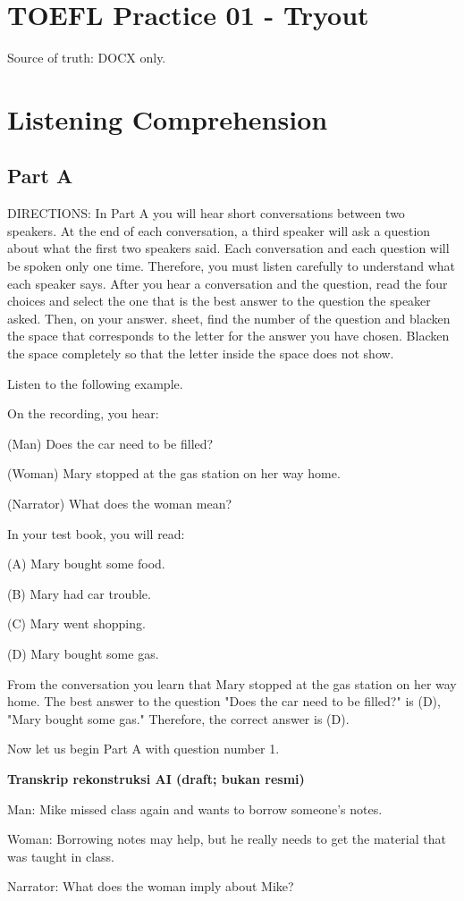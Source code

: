 \documentclass[12pt]{article}
\begin{document}
\section*{TOEFL Practice 01 - Tryout}
Source of truth: DOCX only.
\section*{Listening Comprehension}
\subsection*{Part A}
DIRECTIONS: In Part A you will hear short conversations between two speakers. At the end of each conversation, a third speaker will ask a question about what the first two speakers said. Each conversation and each question will be spoken only one time. Therefore, you must listen carefully to understand what each speaker says. After you hear a conversation and the question, read the four choices and select the one that is the best answer to the question the speaker asked. Then, on your answer. sheet, find the number of the question and blacken the space that corresponds to the letter for the answer you have chosen. Blacken the space completely so that the letter inside the space does not show.\par
\begin{exampleblock}
Listen to the following example.\par
On the recording, you hear:\par
(Man) Does the car need to be filled?\par
(Woman) Mary stopped at the gas station on her way home.\par
(Narrator) What does the woman mean?\par
In your test book, you will read:\par
(A) Mary bought some food.\par
(B) Mary had car trouble.\par
(C) Mary went shopping.\par
(D) Mary bought some gas.\par
From the conversation you learn that Mary stopped at the gas station on her way home. The best answer to the question "Does the car need to be filled?" is (D), "Mary bought some gas." Therefore, the correct answer is (D).\par
Now let us begin Part A with question number 1.\par
\end{exampleblock}
\begin{exampleblock}
\textbf{Transkrip rekonstruksi AI (draft; bukan resmi)}\par
Man: Mike missed class again and wants to borrow someone's notes.\par
Woman: Borrowing notes may help, but he really needs to get the material that was taught in class.\par
Narrator: What does the woman imply about Mike?\par
\end{exampleblock}
\end{document}
